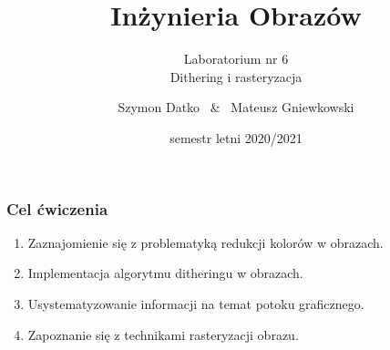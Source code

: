 \documentclass[usenames,dvipsnames,aspectratio=43,presentation]{beamer}
\title{Inżynieria Obrazów}
\subtitle{Laboratorium nr 6 \\
          Dithering i rasteryzacja}
\author{Szymon Datko ~\&~ Mateusz Gniewkowski}
\institute{Wydział Elektroniki, \\
           Politechnika Wrocławska}
\date{semestr letni 2020/2021}
\begin{document}
    \begin{frame}

        \titlepage
    \end{frame}
    
    
    \begin{frame}
        \frametitle{Cel ćwiczenia}
        \footnotesize
        
        \begin{enumerate}
            \setlength{\itemsep}{2.0em}
            \footnotesize
            \item Zaznajomienie się z problematyką redukcji kolorów w obrazach.
            \item Implementacja algorytmu ditheringu w obrazach.
            \item Usystematyzowanie informacji na temat potoku graficznego.
            \item Zapoznanie się z technikami rasteryzacji obrazu.
        \end{enumerate}
    \end{frame}
\end{document}
